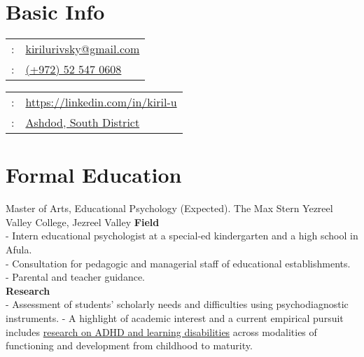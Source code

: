 \setLTR
\maketitle

\section{Basic Info}
\begin{minipage}[t]{.5\linewidth}
\begin{tabular}{rp{.75\linewidth}}
\baselineskip=20pt
\email{} :   & \href{mailto:kirilurivsky@gmail.com}{kirilurivsky@gmail.com}\\
\phone{} : &\href{tel:972525470608}{(+972) 52 547 0608} \\
\end{tabular}
\end{minipage}
\begin{minipage}[t]{.5\linewidth}
\begin{tabular}{rl}
\linkedin{} : &\href{https://www.linkedin.com/in/kiril-u}{https://linkedin.com/in/kiril-u}\\
\location{} : &\href{https://goo.gl/maps/MSacjpSy7vZSKykP7}{Ashdod, South District}                                                                          
\end{tabular}
\end{minipage}



% 

\section{Formal Education}

{Master of Arts, Educational Psychology (Expected). The Max Stern Yezreel Valley College, Jezreel Valley}
{\textbf{Field}\\
- Intern educational psychologist at a special-ed kindergarten and a high school in Afula.  \\
- Consultation for pedagogic and managerial staff of educational establishments.\\
- Parental and teacher guidance. \\
\textbf{Research}\\
- Assessment of students' scholarly needs and difficulties using psychodiagnostic instruments. 
- A highlight of academic interest and a current empirical pursuit includes \href{https://tinyurl.com/ADHD-Coping-Seminar}{research on ADHD and learning disabilities} across modalities of functioning and development from childhood to maturity.}
{}

